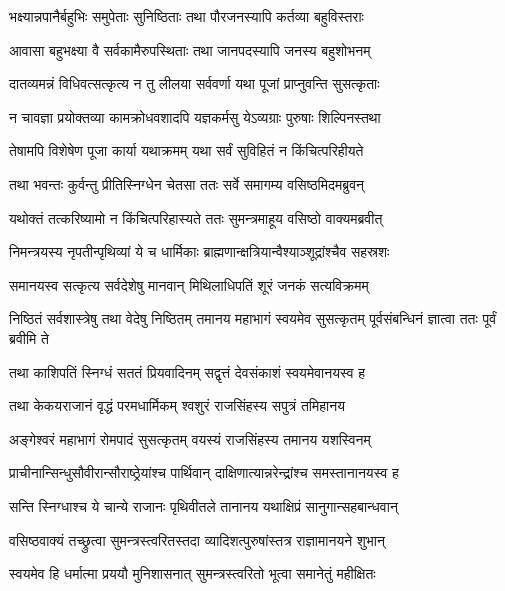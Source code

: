 \twolineshloka
{भक्ष्यान्नपानैर्बहुभिः समुपेताः सुनिष्ठिताः}
{तथा पौरजनस्यापि कर्तव्या बहुविस्तराः} %

\twolineshloka
{आवासा बहुभक्ष्या वै सर्वकामैरुपस्थिताः}
{तथा जानपदस्यापि जनस्य बहुशोभनम्} %

\twolineshloka
{दातव्यमन्नं विधिवत्सत्कृत्य न तु लीलया}
{सर्ववर्णा यथा पूजां प्राप्नुवन्ति सुसत्कृताः} %

\twolineshloka
{न चावज्ञा प्रयोक्तव्या कामक्रोधवशादपि}
{यज्ञकर्मसु येऽव्यग्राः पुरुषाः शिल्पिनस्तथा} %

\twolineshloka
{तेषामपि विशेषेण पूजा कार्या यथाक्रमम्}
{यथा सर्वं सुविहितं न किंचित्परिहीयते} %

\twolineshloka
{तथा भवन्तः कुर्वन्तु प्रीतिस्निग्धेन चेतसा}
{ततः सर्वे समागम्य वसिष्ठमिदमब्रुवन्} %

\twolineshloka
{यथोक्तं तत्करिष्यामो न किंचित्परिहास्यते}
{ततः सुमन्त्रमाहूय वसिष्ठो वाक्यमब्रवीत्} %

\twolineshloka
{निमन्त्रयस्य नृपतीन्पृथिव्यां ये च धार्मिकाः}
{ब्राह्मणान्क्षत्रियान्वैश्याञ्शूद्रांश्चैव सहस्रशः} %

\twolineshloka
{समानयस्व सत्कृत्य सर्वदेशेषु मानवान्}
{मिथिलाधिपतिं शूरं जनकं सत्यविक्रमम्} %

\threelineshloka
{निष्ठितं सर्वशास्त्रेषु तथा वेदेषु निष्ठितम्}
{तमानय महाभागं स्वयमेव सुसत्कृतम्}
{पूर्वसंबन्धिनं ज्ञात्वा ततः पूर्वं ब्रवीमि ते} %

\twolineshloka
{तथा काशिपतिं स्निग्धं सततं प्रियवादिनम्}
{सद्वृत्तं देवसंकाशं स्वयमेवानयस्व ह} %

\twolineshloka
{तथा केकयराजानं वृद्धं परमधार्मिकम्}
{श्वशुरं राजसिंहस्य सपुत्रं तमिहानय} %

\twolineshloka
{अङ्गेश्वरं महाभागं रोमपादं सुसत्कृतम्}
{वयस्यं राजसिंहस्य तमानय यशस्विनम्} %

\twolineshloka
{प्राचीनान्सिन्धुसौवीरान्सौराष्ठ्रेयांश्च पार्थिवान्}
{दाक्षिणात्यान्नरेन्द्रांश्च समस्तानानयस्व ह} %

\twolineshloka
{सन्ति स्निग्धाश्च ये चान्ये राजानः पृथिवीतले}
{तानानय यथाक्षिप्रं सानुगान्सहबान्धवान्} %

\twolineshloka
{वसिष्ठवाक्यं तच्छ्रुत्वा सुमन्त्रस्त्वरितस्तदा}
{व्यादिशत्पुरुषांस्तत्र राज्ञामानयने शुभान्} %

\twolineshloka
{स्वयमेव हि धर्मात्मा प्रययौ मुनिशासनात्}
{सुमन्त्रस्त्वरितो भूत्वा समानेतुं महीक्षितः} %


